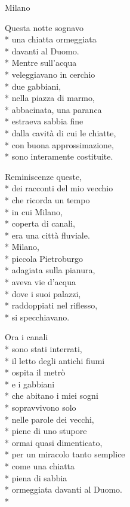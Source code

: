 \documentclass[12pt]{book}
\begin{document}
\begin{poem}{Milano}{}


\begin{altverse}

Questa notte sognavo\\*
una chiatta ormeggiata\\*
davanti al Duomo.\\*
Mentre sull'acqua\\*
veleggiavano in cerchio\\*
due gabbiani,\\*
nella piazza di marmo,\\*
abbacinata, una paranca\\*
estraeva sabbia fine\\*
dalla cavità di cui le chiatte,\\*
con buona approssimazione,\\*
sono interamente costituite.
\end{altverse}

\begin{altverse}
Reminiscenze queste,\\*
dei racconti del mio vecchio\\*
che ricorda un tempo\\*
in cui Milano,\\*
coperta di canali,\\*
era una città fluviale.\\*
Milano,\\*
piccola Pietroburgo\\*
adagiata sulla pianura,\\*
aveva vie d'acqua \\*
dove i suoi palazzi,\\*
raddoppiati nel riflesso,\\*
si specchiavano.
\end{altverse}

\begin{altverse}
Ora i canali\\*
sono stati interrati,\\*
il letto degli antichi fiumi\\*
ospita il metrò\\*
e i gabbiani \\*
che abitano i miei sogni\\*
sopravvivono solo\\*
nelle parole dei vecchi,\\*
piene di uno stupore\\*
ormai quasi dimenticato,\\*
per un miracolo tanto semplice\\*
come una chiatta\\*
piena di sabbia\\*
ormeggiata davanti al Duomo.\\*
\end{altverse}


\end{poem}
\end{document}
